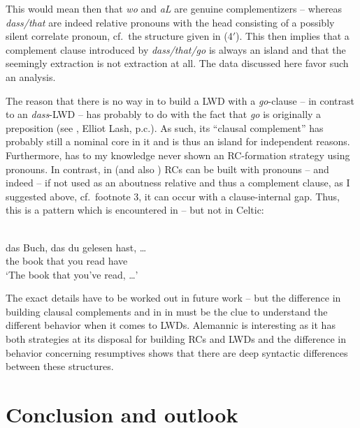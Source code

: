\documentclass[output=paper]{langsci/langscibook}
\begin{document}
This would mean then that  \emph{wo} and  \emph{aL} are genuine
complementizers – whereas \emph{dass/that} are indeed relative pronouns with
the head consisting of a possibly silent correlate pronoun, cf.\ the structure
given in (4$'$). This then implies that a complement clause introduced by
\emph{dass/that/go} is always an island and that the seemingly extraction is
not extraction at all. The data discussed here favor such an analysis.

The reason that there is no way in  to build a \gls{LWD} with a
\emph{go}-clause – in contrast to an  \emph{dass}-\gls{LWD} –
has probably to do with the fact that \emph{go} is originally a preposition
(see \citealt{Braesicke}, Elliot Lash, p.c.). As such, its \enquote{clausal
complement} has probably still a nominal core in it and is thus an island for
independent reasons.  Furthermore,  has to my knowledge never shown an
RC-formation strategy using pronouns. In contrast, in  (and also
) \glspl{RC} can be built with pronouns – and indeed – if not
used as an aboutness relative and thus a complement clause, as I suggested
above, cf.\ footnote 3, it can occur with a clause-internal gap. Thus, this is
a pattern which is encountered in  -- but not in Celtic:

\ea\label{ex:key:36.19} \\
    \gll    das Buch, das   du  \underline{\hphantom{2em}}  gelesen hast, \dots{}\\
    the book that you  {}   read       have\\
    \glt    ‘The book that you’ve read, \dots{}’
\z

The exact details have to be worked out in future work – but the difference in
building clausal complements and  in  in  must be
the clue to understand the different behavior when it comes to \glspl{LWD}.
Alemannic is interesting as it has both strategies at its disposal for building
\glspl{RC} and \glspl{LWD} and the difference in behavior concerning
resumptives shows that there are deep syntactic differences between these
structures.

\section{Conclusion and outlook} %
\end{document}

